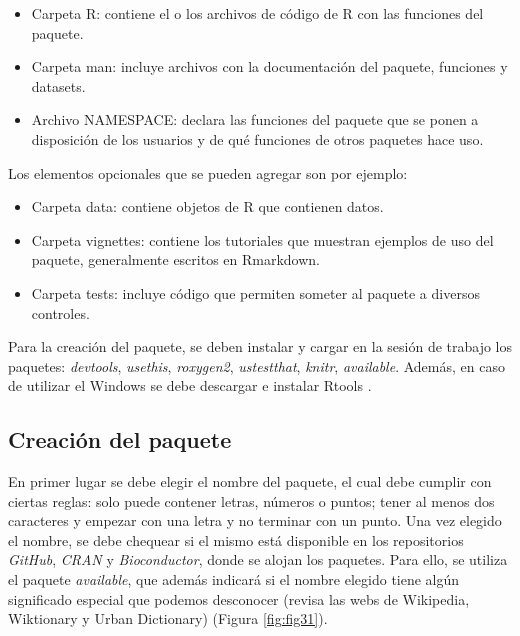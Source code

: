 \begin{itemize}
	\item Carpeta R: contiene el o los archivos de código de R con las funciones del paquete.
\end{itemize}

\begin{itemize}
	\item Carpeta man: incluye archivos con la documentación del paquete, funciones y datasets.
\end{itemize}

\begin{itemize}
	\item Archivo NAMESPACE: declara las funciones del paquete que se ponen a disposición de los usuarios y de qué funciones de otros paquetes hace uso.
\end{itemize}


Los elementos opcionales que se pueden agregar son por ejemplo:

\begin{itemize}
	\item Carpeta data: contiene objetos de R que contienen datos.
\end{itemize}

\begin{itemize}
	\item Carpeta vignettes: contiene los tutoriales que muestran ejemplos de uso del paquete, generalmente escritos en Rmarkdown.
\end{itemize}

\begin{itemize}
	\item Carpeta tests: incluye código que permiten someter al paquete a diversos controles.
\end{itemize}



Para la creación del paquete, se deben instalar y cargar en la sesión de trabajo los paquetes:
 \emph{devtools}, \emph{usethis}, \emph{roxygen2}, \emph{ustestthat}, \emph{knitr}, \emph{available}. Además, en caso de utilizar el Windows se debe descargar e instalar Rtools .


\subsection{Creación del paquete}

En primer lugar se debe elegir el nombre del paquete, el cual debe cumplir con ciertas reglas: solo puede contener letras, números o puntos; tener al menos dos caracteres y empezar con una letra y no terminar con un punto. Una vez elegido el nombre, se debe chequear si el mismo está disponible en los repositorios \emph{GitHub}, \emph{CRAN} y \emph{Bioconductor}, donde se alojan los paquetes. Para ello, se utiliza el paquete \emph{available}, que además indicará si el nombre elegido tiene algún significado especial que podemos desconocer (revisa las webs de Wikipedia, Wiktionary y Urban Dictionary) (Figura \ref{fig:fig31}). 

